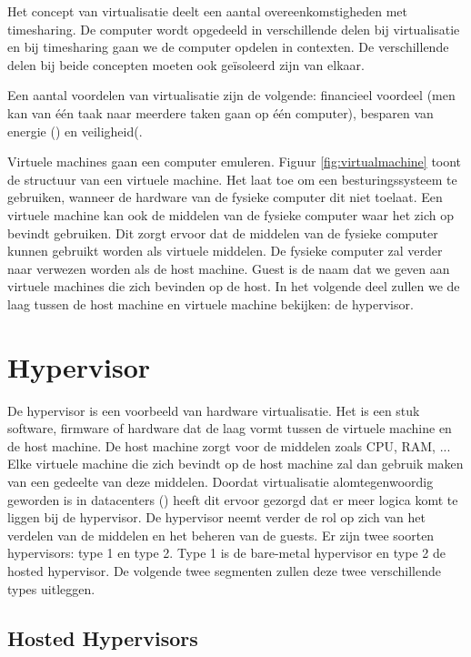 \documentclass[pdftex,a4paper,12pt,twoside]{report}
\begin{document}
Het concept van virtualisatie deelt een aantal overeenkomstigheden met timesharing. De computer wordt opgedeeld in verschillende delen bij virtualisatie en bij timesharing gaan we de computer opdelen in contexten. De verschillende delen bij beide concepten moeten ook geïsoleerd zijn van elkaar.

Een aantal voordelen van virtualisatie zijn de volgende: financieel voordeel (men kan van één taak naar meerdere taken gaan op één computer), besparen van energie (\cite{Beloglazov2010}) en veiligheid(\cite{Mortleman2009}.

Virtuele machines gaan een computer emuleren. Figuur \ref{fig:virtualmachine} toont de structuur van een virtuele machine. Het laat toe om een besturingssysteem te gebruiken, wanneer de hardware van de fysieke computer dit niet toelaat. Een virtuele machine kan ook de middelen van de fysieke computer waar het zich op bevindt gebruiken. Dit zorgt ervoor dat de middelen van de fysieke computer kunnen gebruikt worden als virtuele middelen. De fysieke computer zal verder naar verwezen worden als de host machine. Guest is de naam dat we geven aan virtuele machines die zich bevinden op de host. In het volgende deel zullen we de laag tussen de host machine en virtuele machine bekijken: de hypervisor. 

\section{Hypervisor}

De hypervisor is een voorbeeld van hardware virtualisatie. Het is een stuk software, firmware of hardware dat de laag vormt tussen de virtuele machine en de host machine. De host machine zorgt voor de middelen zoals CPU, RAM, ... Elke virtuele machine die zich bevindt op de host machine zal dan gebruik maken van een gedeelte van deze middelen. Doordat virtualisatie alomtegenwoordig geworden is in datacenters (\cite{Soundararajan2010}) heeft dit ervoor gezorgd dat er meer logica komt te liggen bij de hypervisor. De hypervisor neemt verder de rol op zich van het verdelen van de middelen en het beheren van de guests. Er zijn twee soorten hypervisors: type 1 en type 2. Type 1 is de bare-metal hypervisor en type 2 de hosted hypervisor. De volgende twee segmenten zullen deze twee verschillende types uitleggen.

\newpage

\subsection{Hosted Hypervisors}
\end{document}
